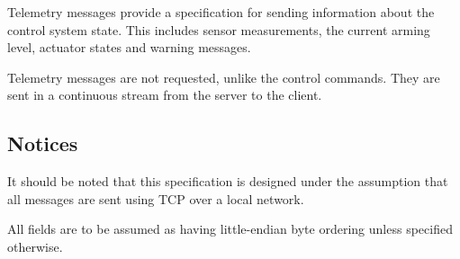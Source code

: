 Telemetry messages provide a specification for sending information about the control system state. This includes sensor
measurements, the current arming level, actuator states and warning messages.

Telemetry messages are not requested, unlike the control commands. They are sent in a continuous stream from the server
to the client.

\subsection{Notices}

It should be noted that this specification is designed under the assumption that all messages are sent using TCP over a
local network.

All fields are to be assumed as having little-endian byte ordering unless specified otherwise.
